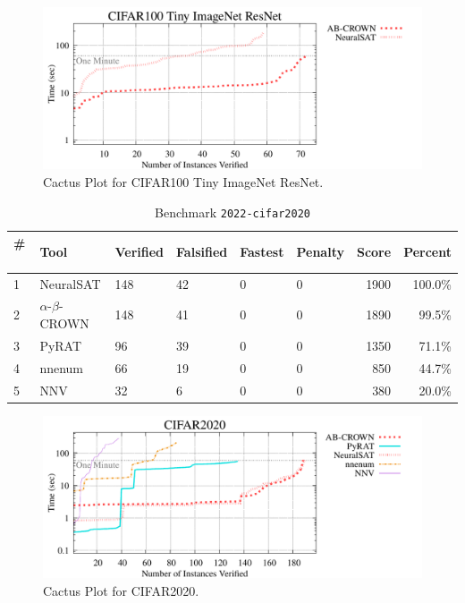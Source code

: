 \begin{figure}[h]
\centerline{\includegraphics[width=\textwidth]{cactus/2022_cifar100_tinyimagenet_resnet.pdf}}
\caption{Cactus Plot for CIFAR100 Tiny ImageNet ResNet.}
\label{fig:quantPic}
\end{figure}



\begin{table}[h]
\begin{center}
\caption{Benchmark \texttt{2022-cifar2020}} \label{tab:cat_{cat}}
{\setlength{\tabcolsep}{2pt}
\begin{tabular}[h]{@{}llllllrr@{}}
\toprule
\textbf{\# ~} & \textbf{Tool} & \textbf{Verified} & \textbf{Falsified} & \textbf{Fastest} & \textbf{Penalty} & \textbf{Score} & \textbf{Percent}\\
\midrule
1 & NeuralSAT & 148 & 42 & 0 & 0 & 1900 & 100.0\% \\
2 & $\alpha$-$\beta$-CROWN & 148 & 41 & 0 & 0 & 1890 & 99.5\% \\
3 & PyRAT & 96 & 39 & 0 & 0 & 1350 & 71.1\% \\
4 & nnenum & 66 & 19 & 0 & 0 & 850 & 44.7\% \\
5 & NNV & 32 & 6 & 0 & 0 & 380 & 20.0\% \\
\bottomrule
\end{tabular}
}
\end{center}
\end{table}



\begin{figure}[h]
\centerline{\includegraphics[width=\textwidth]{cactus/2022_cifar2020.pdf}}
\caption{Cactus Plot for CIFAR2020.}
\label{fig:quantPic}
\end{figure}


